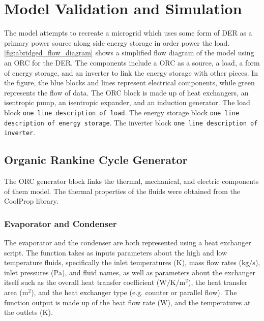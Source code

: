 \chapter{Model Validation and Simulation}
\label{ch:model}

The model attempts to recreate a microgrid which uses some form of DER as a primary power source along side energy storage in order power the load. \autoref{fig:abridged_flow_diagram} shows a simplified flow diagram of the model using an ORC for the DER. The components include a ORC as a source, a load, a form of energy storage, and an inverter to link the energy storage with other pieces. In the figure, the blue blocks and lines represent electrical components, while green represents the flow of data. The ORC block is made up of heat exchangers, an isentropic pump, an isentropic expander, and an induction generator. 
The load block \verb|one line description of load|. 
The energy storage block \verb|one line description of energy storage|. 
The inverter block \verb|one line description of inverter|.



\section{Organic Rankine Cycle Generator}
The ORC generator block links the thermal, mechanical, and electric components of them model. The thermal properties of the fluids were obtained from the CoolProp library. \cite{Bell2014}
\subsection{Evaporator and Condenser}
The evaporator and the condenser are both represented using a heat exchanger script.  The function takes as inputs parameters about the high and low temperature fluids, specifically the inlet temperatures ($\si{\kelvin}$), mass flow rates ($\si{\kilogram\per\second} $), inlet pressures ($\si{\pascal}$), and fluid names, as well as parameters about the exchanger itself such as the overall heat transfer coefficient ($\si{\watt\per\kelvin\per\meter\squared}$), the heat transfer area ($\si{\meter\squared}$), and the heat exchanger type (e.g. counter or parallel flow). The function output is made up of the heat flow rate ($\si{\watt}$), and the temperatures at the outlets ($\si{\kelvin}$).

